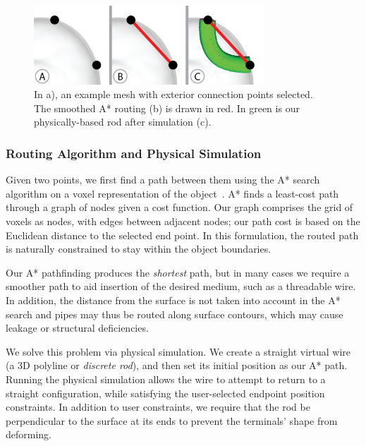 \begin{figure}[h!]
\centering
    \includegraphics[width=3.4in]{figures/exterior.png}
\caption{In a), an example mesh with exterior connection points selected.  The smoothed A* routing (b) is drawn in {\color{red}red}.  In {\color{tovi}green} is our physically-based rod after simulation (c).}
\label{fig:tool-process-exterior}
\end{figure}

\subsubsection{Routing Algorithm and Physical Simulation}
Given two points, we first find a path between them using the A* search algorithm on a voxel representation of the object~\cite{Hart-Astar}. A* finds a least-cost path through a graph of nodes given a cost function. Our graph comprises the grid of voxels as nodes, with edges between adjacent nodes; our path cost is based on the Euclidean distance to the selected end point. In this formulation, the routed path is naturally constrained to stay within the object boundaries.

Our A* pathfinding produces the \emph{shortest} path, but in many cases
we require a smoother path to aid insertion of the desired medium, such as a threadable wire.
In addition, the distance from the surface is not taken into account in the A* search and pipes may thus be routed along surface contours, which may cause leakage or structural deficiencies.

We solve this problem via physical simulation. We create a straight virtual 
wire (a 3D polyline or \emph{discrete rod}), and then set its initial position 
as our A* path.
Running the physical simulation allows the wire to attempt to return to
a straight configuration, while satisfying the user-selected endpoint position constraints.  In addition to user constraints, we require that the rod be perpendicular to the surface at its ends to prevent the terminals' shape from deforming.

